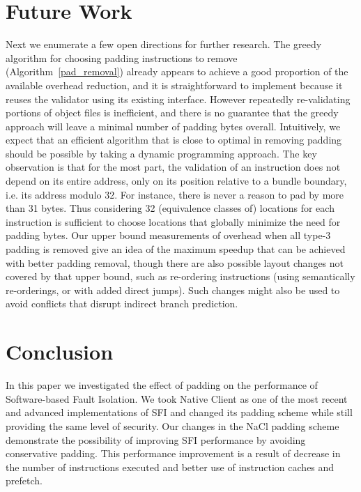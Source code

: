 \documentclass[conference]{IEEEtran}
\begin{document}
\section{Future Work}
\label{future}
Next we enumerate a few open directions for further research.
The greedy algorithm for choosing padding instructions to remove
(Algorithm~\ref{pad_removal}) already appears to achieve a good
proportion of the available overhead reduction, and it is
straightforward to implement because it reuses the validator using its
existing interface.
However repeatedly re-validating portions of object files is
inefficient, and there is no guarantee that the greedy approach will
leave a minimal number of padding bytes overall.
Intuitively, we expect that an efficient algorithm that is close to
optimal in removing padding should be possible by taking a dynamic
programming approach.
The key observation is that for the most part, the validation of an
instruction does not depend on its entire address, only on its
position relative to a bundle boundary, i.e. its address modulo 32.
For instance, there is never a reason to pad by more than 31 bytes.
Thus considering 32 (equivalence classes of) locations for each
instruction is sufficient to choose locations that globally minimize
the need for padding bytes.
Our upper bound measurements of overhead when all type-3 padding is
removed give an idea of the maximum speedup that can be achieved with
better padding removal, though there are also possible layout changes
not covered by that upper bound, such as re-ordering instructions (using semantically re-orderings, or with
added direct jumps). Such changes might also be used to avoid conflicts that disrupt indirect branch prediction.





\section{Conclusion}
\label{concl}
In this paper we investigated the effect of padding on the performance of Software-based Fault Isolation. We took Native Client as one of the most recent and advanced implementations of SFI and changed its padding scheme while still providing the same level of security. Our changes in the NaCl padding scheme demonstrate the possibility of improving SFI performance by avoiding conservative padding. This performance improvement is a result of decrease in the number of instructions executed and better use of instruction caches and prefetch.
\end{document}

